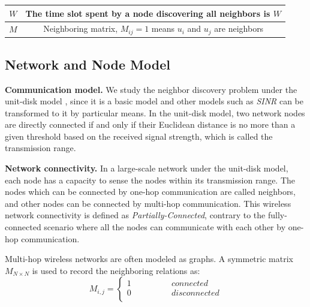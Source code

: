 \begin{table}[!t]
{\begin{tabular}{|c|c|}
$W$ & The time slot spent by a node discovering all neighbors is $W$ \\
\hline
$M$ & Neighboring matrix, $M_{ij}=1$ means $u_i$ and $u_j$ are neighbors \\
\hline
\end{tabular}}
\end{table}


\subsection{Network and Node Model}

\textbf{Communication model.} We study the neighbor discovery 
problem under the unit-disk model \cite{moscibroda2006complexity, wang2015connectivity}, 
since it is a basic model and other models such as \emph{SINR} can be transformed to 
it by particular means. %
In the unit-disk model, two network nodes are directly connected if and only 
if their Euclidean distance is no more than a given threshold based on the received signal strength, 
which is called the transmission range.

\textbf{Network connectivity.} In a large-scale network under the unit-disk model, 
each node has a capacity to sense the nodes within its transmission range.
The nodes which can be connected by one-hop communication are called neighbors,
and other nodes can be connected by multi-hop communication.
This wireless network connectivity is defined as \emph{Partially-Connected},
contrary to the fully-connected scenario where all the nodes can communicate with 
each other by one-hop communication.

Multi-hop wireless networks are often modeled as graphs. 
A symmetric matrix $M_{N\times N}$ is used to record the neighboring relations as:
$$ M_{i,j}=\left\{
\begin{aligned}
1  & & & & & & {connected}\\
0  & & & & & & {disconnected}\\
\end{aligned}
\right.
$$

